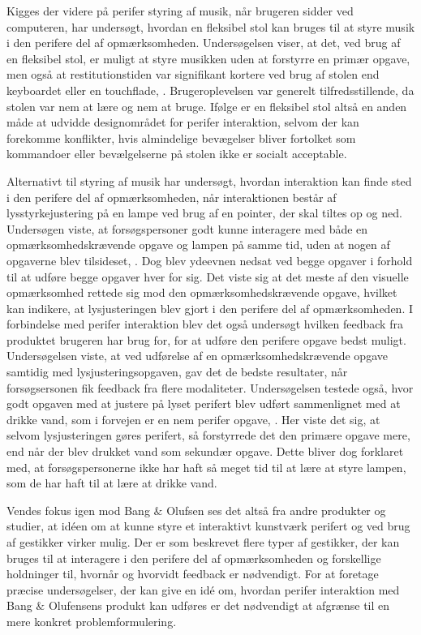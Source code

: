 Kigges der videre på perifer styring af musik, når brugeren sidder ved computeren, har \textcite[ss. 5-9]{PDF:AChairAsUbiquitousInputDevice} undersøgt, hvordan en fleksibel stol kan bruges til at styre musik i den perifere del af opmærksomheden. Undersøgelsen viser, at det, ved brug af en fleksibel stol, er muligt at styre musikken uden at forstyrre en primær opgave, men også at restitutionstiden var signifikant kortere ved brug af stolen end keyboardet eller en touchflade, \parencite[s. 7]{PDF:AChairAsUbiquitousInputDevice}. Brugeroplevelsen var generelt tilfredsstillende, da stolen var nem at lære og nem at bruge. Ifølge \textcite[s. 8]{PDF:AChairAsUbiquitousInputDevice} er en fleksibel stol altså en anden måde at udvidde designområdet for perifer interaktion, selvom der kan forekomme konflikter, hvis almindelige bevægelser bliver fortolket som kommandoer eller bevælgelserne på stolen ikke er socialt acceptable.

Alternativt til styring af musik har \textcite[s. 1]{PDF:FacilitatingPIDesignAndEvaluation} undersøgt, hvordan interaktion kan finde sted i den perifere del af opmærksomheden, når interaktionen består af lysstyrkejustering på en lampe ved brug af en pointer, der skal tiltes op og ned. Undersøgen viste, at forsøgspersoner godt kunne interagere med både en opmærksomhedskrævende opgave og lampen på samme tid, uden at nogen af opgaverne blev tilsideset, \parencite[ss. 20-21]{PDF:FacilitatingPIDesignAndEvaluation}. Dog blev ydeevnen nedsat ved begge opgaver i forhold til at udføre begge opgaver hver for sig. Det viste sig at det meste af den visuelle opmærksomhed rettede sig mod den opmærksomhedskrævende opgave, hvilket kan indikere, at lysjusteringen blev gjort i den perifere del af opmærksomheden. I forbindelse med perifer interaktion blev det også undersøgt hvilken feedback fra produktet brugeren har brug for, for at udføre den perifere opgave bedst muligt. Undersøgelsen viste, at ved udførelse af en opmærksomhedskrævende opgave samtidig med lysjusteringsopgaven, gav det de bedste resultater, når forsøgsersonen fik feedback fra flere modaliteter.  Undersøgelsen testede også, hvor godt opgaven med at justere på lyset perifert blev udført sammenlignet med at drikke vand, som i forvejen er en nem perifer opgave, \parencite[s. 20]{PDF:FacilitatingPIDesignAndEvaluation}. Her viste det sig, at selvom lysjusteringen gøres perifert, så forstyrrede det den primære opgave mere, end når der blev drukket vand som sekundær opgave. Dette bliver dog forklaret med, at forsøgspersonerne ikke har haft så meget tid til at lære at styre lampen, som de har haft til at lære at drikke vand. 

Vendes fokus igen mod Bang $\&$ Olufsen ses det altså fra andre produkter og studier, at idéen om at kunne styre et interaktivt kunstværk perifert og ved brug af gestikker virker mulig. Der er som beskrevet flere typer af gestikker, der kan bruges til at interagere i den perifere del af opmærksomheden og forskellige holdninger til, hvornår og hvorvidt feedback er nødvendigt. For at foretage præcise undersøgelser, der kan give en idé om, hvordan perifer interaktion med Bang $\&$ Olufensens produkt kan udføres er det nødvendigt at afgrænse til en mere konkret problemformulering.